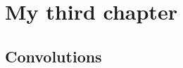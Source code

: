 \chapter{My third chapter}
\label{chapter3}

\ifpdf
    \graphicspath{{Chapter3/Figs/Raster/}{Chapter3/Figs/PDF/}{Chapter3/Figs/}}
\else
    \graphicspath{{Chapter3/Figs/Vector/}{Chapter3/Figs/}}
\fi

\section{Convolutions}
\label{section3.1}